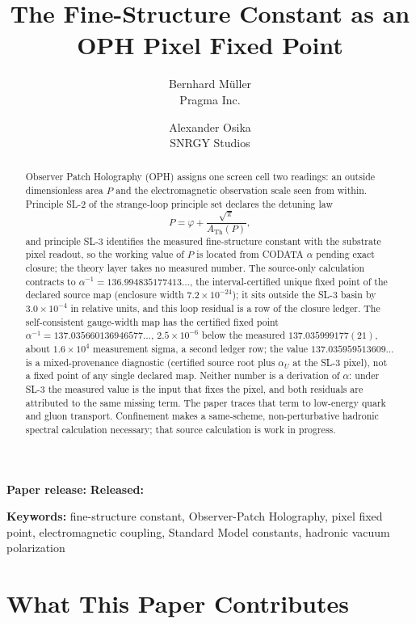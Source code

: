 \documentclass[11pt]{article}
\title{\textbf{The Fine-Structure Constant as an OPH Pixel Fixed Point}}
\author{Bernhard M\"uller\\Pragma Inc.
\and
Alexander Osika\\SNRGY Studios}
\date{}
\theoremstyle{remark}
\newcommand{\ATh}{A_{\mathrm{Th}}}
\begin{document}
\maketitle
\begin{center}
\small\textbf{Paper release:} \OPHPaperReleaseID\quad
\textbf{Released:} \OPHPaperReleaseDate
\end{center}

\begin{abstract}
Observer Patch Holography (OPH) assigns one screen cell two readings: an
outside dimensionless area \(P\) and the electromagnetic observation scale
seen from within. Principle SL-2 of the strange-loop principle set
declares the detuning law
\[
P=\varphi+\frac{\sqrt\pi}{\ATh(P)},
\]
and principle SL-3 identifies the measured fine-structure constant with the
substrate pixel readout, so the working value of \(P\) is located from CODATA
\(\alpha\) pending exact closure; the theory layer takes no measured number.
The source-only
calculation contracts to \(\alpha^{-1}=136.994835177413\ldots\), the
interval-certified unique fixed point of the declared source map (enclosure
width \(7.2\times10^{-24}\)); it sits outside the SL-3 basin by
\(3.0\times10^{-4}\) in relative units, and this loop residual is a row of
the closure ledger. The self-consistent gauge-width map has the certified
fixed point \(\alpha^{-1}=137.035660136946577\ldots\), \(2.5\times10^{-6}\)
below the measured \(137.035999177(21)\), about \(1.6\times10^{4}\)
measurement sigma, a second ledger row; the value
\(137.035959513609\ldots\) is a mixed-provenance diagnostic (certified source root
plus \(\alpha_U\) at the SL-3 pixel), not a fixed point of any single declared map.
Neither number is a derivation of \(\alpha\): under SL-3 the measured value is
the input that fixes the pixel, and both residuals are attributed to the same
missing term. The paper traces that term to low-energy quark and gluon
transport. Confinement makes a same-scheme, non-perturbative hadronic spectral
calculation necessary; that source calculation is work in progress.
\end{abstract}

\noindent\textbf{Keywords:} fine-structure constant, Observer-Patch Holography, pixel fixed
point, electromagnetic coupling, Standard Model constants, hadronic vacuum polarization

\section*{What This Paper Contributes}
\end{document}
